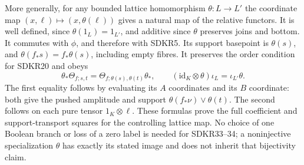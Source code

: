 More generally, for any bounded lattice homomorphism
$\theta:L\to L'$ the coordinate map
$(x,\ell)\mapsto(x,\theta(\ell))$ gives a natural
map of the relative functors. It is well defined,
since $\theta(1_L)=1_{L'}$, and additive since
$\theta$ preserves joins and bottom. It commutes
with $\phi$, and therefore with SDKR5. Its support
basepoint is $\theta(s)$, and
$\theta(f_*s)=f_*\theta(s)$, including empty
fibres. It preserves the order condition for
SDKR20 and obeys
\begin{equation}\tag{SDKR35}
\theta_*\Theta_{f;s,t}
 =\Theta_{f;\theta(s),\theta(t)}\theta_*,
\qquad
(\mathrm{id}_K\otimes\theta)\iota_L
                   =\iota_{L'}\theta .
\end{equation}
The first equality follows by evaluating its $A$
coordinates and its $B$ coordinate:
both give the pushed amplitude and support
$\theta(f_*\nu)\vee\theta(t)$.
The second follows on each pure tensor
$1_K\otimes\ell$. These formulas prove the full
coefficient and support-transport squares for
the controlling lattice map. No choice of one
Boolean branch or loss of a zero label is
needed for SDKR33--34; a noninjective specialization
$\theta$ has exactly its stated image and does
not inherit that bijectivity claim.
